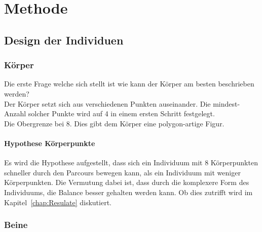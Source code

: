 %
%


\chapter{Methode}


  \section{Design der Individuen}

    \subsection{Körper\label{sub:Körper}}

      Die erste Frage welche sich stellt ist wie kann der Körper am besten beschrieben werden?
      \\
      Der Körper setzt sich aus verschiedenen Punkten auseinander.
      Die mindest- Anzahl solcher Punkte wird auf 4 in einem ersten Schritt festgelegt.
      \\
      Die Obergrenze bei 8.
      Dies gibt dem Körper eine polygon-artige Figur.

      \subsubsection{Hypothese Körperpunkte\label{subsub:hypoKp}}

        Es wird die Hypothese aufgestellt,
        dass sich ein Individuum mit 8 Körperpunkten schneller durch den Parcours bewegen kann,
        als ein Individuum mit weniger Körperpunkten.
        Die Vermutung dabei ist, dass durch die komplexere Form des Individuums,
        die Balance besser gehalten werden kann.
        Ob dies zutrifft wird im Kapitel~\ref{chap:Resulate} diskutiert.

    \subsection{Beine\label{sub:Beine}}

